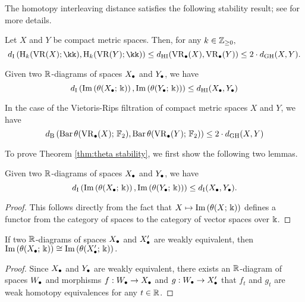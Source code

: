 The homotopy interleaving distance satisfies the following stability result; see \cite[Proposition 1.9 \& Theorem 1.10]{blumberg2023universality} for more details.

\begin{theorem} 
\label{thm:stability-HI}
Let $X$ and $Y$ be compact metric spaces. Then, for any $k\in \mathbb{Z}_{\geq 0},$
        \[
	\di \left(\rH_k(\VR(X); \kk), \rH_k(\VR(Y); \kk)\right) \leq  \dhi(  \VR_{\bullet}(X)  ,  \VR_{\bullet}(Y)  )\leq 2\cdot d_{\mathrm{GH}}(X, Y).
	\] 
\end{theorem}


\begin{theorem}\label{thm:theta stability}
    Given two $\mathbb{R}$-diagrams of spaces $X_\bullet$ and $Y_\bullet$, we have
    \begin{equation}\label{eq:theta di-stability}
        d_{\mathrm{I}}\left(\operatorname{Im}\left(\theta(X_\bullet;\,\Bbbk)\right), \operatorname{Im}\left(\theta(Y_\bullet;\,\Bbbk)\right)\right)\leq d_{\mathrm{HI}}(X_\bullet,Y_\bullet)
    \end{equation}

    In the case of the Vietoris-Rips filtration of compact metric spaces $X$ and $Y$, we have
    \[d_{\mathrm{B}}\left(\operatorname{Bar}\theta(\operatorname{VR}_\bullet(X);\,{\mathbb{F}_2}), \operatorname{Bar}\theta(\operatorname{VR}_\bullet(Y);\,{\mathbb{F}_2})\right)\leq 2\cdot d_{\mathrm{GH}}(X,Y)\]

\end{theorem}

To prove Theorem \ref{thm:theta stability}, we first show the following two lemmas.

\begin{lemma}\label{lem:di stability}
    Given two $\mathbb{R}$-diagrams of spaces $X_\bullet$ and $Y_\bullet$, we have
    \[d_{\mathrm{I}}\left(\operatorname{Im}\left(\theta(X_\bullet;\,\Bbbk)\right), \operatorname{Im}\left(\theta(Y_\bullet;\,\Bbbk)\right)\right)\leq d_{\mathrm{I}}(X_\bullet,Y_\bullet).\]
\end{lemma}
\begin{proof}
    This follows directly from the fact that $X\mapsto \operatorname{Im}\left(\theta(X;\,\Bbbk)\right)$ defines a functor from the category of spaces to the category of vector spaces over $\Bbbk$.
\end{proof}

\begin{lemma}\label{lem:w.h.e. preservance}
    If two $\mathbb{R}$-diagrams of spaces $X_\bullet$ and $X_\bullet'$ are weakly equivalent, then $\operatorname{Im}\left(\theta(X_\bullet;\,\Bbbk)\right)\cong\operatorname{Im}\left(\theta(X_\bullet';\,\Bbbk)\right).$
\end{lemma}
\begin{proof}
    Since $X_\bullet$ and $Y_\bullet$ are weakly equivalent, there exists an $\mathbb{R}$-diagram of spaces $W_\bullet$ and morphisms $f:W_\bullet\to X_\bullet$ and $g:W_\bullet\to X_\bullet'$ that  $f_t$ and $g_t$ are weak homotopy equivalences for any $t\in \mathbb{R}$.
\end{proof}

